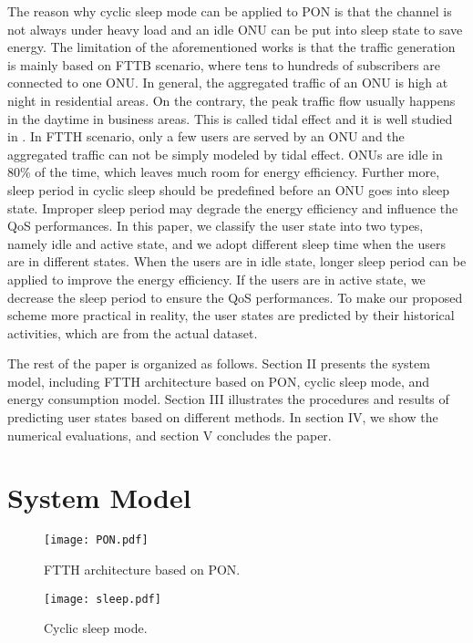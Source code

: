 \documentclass[journal]{IEEEtran}
\begin{document}
The reason why cyclic sleep mode can be applied to PON is that the channel is not always under heavy load and an idle ONU can be put into sleep state to save energy. The limitation of the aforementioned works is that the traffic generation is mainly based on FTTB scenario, where tens to hundreds of subscribers are connected to one ONU. In general, the aggregated traffic of an ONU is high at night in residential areas. On the contrary, the peak traffic flow usually happens in the daytime in business areas. This is called tidal effect and it is well studied in \cite{7444562, 6848766}. In FTTH scenario, only a few users are served by an ONU and the aggregated traffic can not be simply modeled by tidal effect. ONUs are idle in 80\% of the time, which leaves much room for energy efficiency. Further more, sleep period in cyclic sleep should be predefined before an ONU goes into sleep state. Improper sleep period may degrade the energy efficiency and influence the QoS performances. In this paper, we classify the user state into two types, namely idle and active state, and we adopt different sleep time when the users are in different states. When the users are in idle state, longer sleep period can be applied to improve the energy efficiency. If the users are in active state, we decrease the sleep period to ensure the QoS performances. To make our proposed scheme more practical in reality, the user states are predicted by their historical activities, which are from the actual dataset.

The rest of the paper is organized as follows. Section II presents the system model, including FTTH architecture based on PON, cyclic sleep mode, and energy consumption model. Section III illustrates the procedures and results of predicting user states based on different methods. In section IV, we show the numerical evaluations, and section V concludes the paper.


\section{System Model}

\begin{figure}[t]
    \centering 
        \texttt{[image: PON.pdf]}\\ 
    \caption{ FTTH architecture based on PON.}
    \label{PON}
\end{figure}

\begin{figure}[t]
    \centering 
        \texttt{[image: sleep.pdf]}\\ 
    \caption{ Cyclic sleep mode.}
    \label{sleep}
\end{figure}
\end{document}
